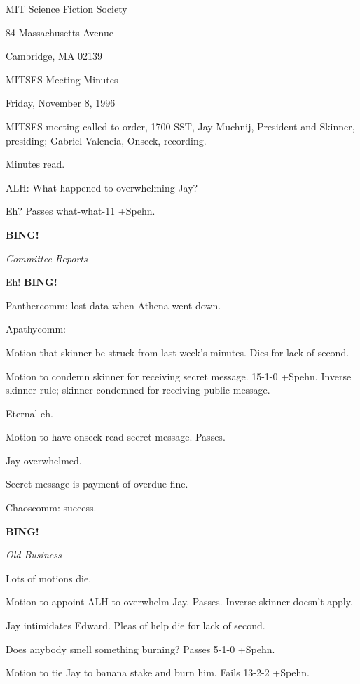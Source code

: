 \documentclass[12pt]{article}
\newcommand{\bing}{{\bf BING!} }
\newcommand{\goto}[1]{\bing \vskip 12pt \centerline{{\em{#1}}}}
\begin{document}
\begin{center}

MIT Science Fiction Society 

84 Massachusetts Avenue

Cambridge, MA 02139

\vspace{12pt}

MITSFS Meeting Minutes 

Friday, November 8, 1996

\end{center}
 
\vspace{18pt}

\setlength{\parskip}{6pt}

\noindent
MITSFS meeting called to order, 1700 SST,
Jay Muchnij, President and Skinner, presiding; Gabriel Valencia, Onseck, recording.

Minutes read.

ALH: What happened to overwhelming Jay?

Eh? Passes what-what-11 +Spehn.

\goto{Committee Reports}

Eh! \bing

Panthercomm: lost data when Athena went down.

Apathycomm:

Motion that skinner be struck from last week's minutes. Dies for lack of second.

Motion to condemn skinner for receiving secret message. 15-1-0 +Spehn. Inverse skinner rule; skinner condemned for receiving public message.

Eternal eh.

Motion to have onseck read secret message. Passes.

Jay overwhelmed.

Secret message is payment of overdue fine.

Chaoscomm: success.

\goto{Old Business}

Lots of motions die.

Motion to appoint ALH to overwhelm Jay. Passes. Inverse skinner doesn't apply.

Jay intimidates Edward. Pleas of help die for lack of second.

Does anybody smell something burning? Passes 5-1-0 +Spehn.

Motion to tie Jay to banana stake and burn him. Fails 13-2-2 +Spehn.
\end{document}
